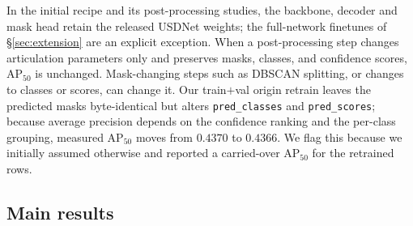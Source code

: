\documentclass[11pt]{article}
\newcommand{\apfifty}{AP$_{50}$}
\begin{document}
In the initial recipe and its post-processing studies, the backbone, decoder
and mask head retain the released USDNet weights; the full-network
finetunes of \S\ref{sec:extension} are an explicit exception. When a
post-processing step changes articulation parameters only and preserves
masks, classes, and confidence scores, \apfifty{} is unchanged. Mask-changing
steps such as DBSCAN splitting, or changes to classes or scores, can change
it. Our
train$+$val origin retrain leaves the predicted masks byte-identical but
alters \texttt{pred\_classes} and \texttt{pred\_scores}; because average
precision depends on the confidence ranking and the per-class grouping,
measured \apfifty{} moves from $0.4370$ to $0.4366$. We flag this because we
initially assumed otherwise and reported a carried-over \apfifty{} for the
retrained rows.

\subsection{Main results}
\end{document}

